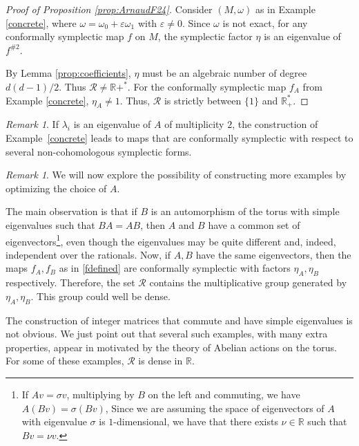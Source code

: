 \documentclass[11pt]{amsart}
\theoremstyle{definition}
\theoremstyle{remark}
\newtheorem{rem}[thm]{Remark}
\numberwithin{equation}{section}
\newcommand{\R}{\mathbb R}
\newcommand{\eps}{\varepsilon}
\def\cR{\mathcal{R}}
\begin{document}
\begin{proof}[Proof of Proposition \ref{prop:ArnaudF24}]
 Consider $(M,\omega)$ as in Example \ref{concrete}, where $\omega = \omega_0 + \eps \omega_1$ with $\eps\neq0$.
 Since $\omega$ is not exact, for any conformally symplectic map $f$ on $M$, the symplectic factor $\eta$ is an eigenvalue of $f^{\# 2}$.


 By Lemma \ref{prop:coefficients}, $\eta$ must be an algebraic number of degree $d(d-1)/2$.
 Thus $\mathcal{R}\neq \R+^*$.
 For the conformally symplectic map $f_A$ from Example \ref{concrete}, $\eta_A\neq 1$.
 Thus,  $\mathcal{R}$ is strictly between $\{1\}$ and $\R_+^*$.
\end{proof}




\begin{rem}
  If $\lambda_i$ is an eigenvalue of $A$ of multiplicity $2$,
  the construction of Example~\ref{concrete} leads to
  maps that are conformally symplectic with respect to
  several non-cohomologous symplectic forms.
\end{rem}

\begin{rem}
We will now explore the possibility of
constructing more examples by optimizing the choice of $A$.

The main  observation is that if $B$ is an automorphism of
the torus with simple eigenvalues such that $BA = AB$, then
$A$ and $B$ have a common set of eigenvectors\footnote{
If $Av = \sigma v$, multiplying by $B$ on the left and
commuting, we have $A (Bv)= \sigma(B v)$,
Since we are assuming the space of eigenvectors of $A$ with eigenvalue $\sigma$
is $1$-dimensional, we have that there exists $\nu \in \R$ such that $Bv = \nu v$.}, even though the eigenvalues
may be quite different and, indeed, independent over the rationals.
Now, if $A, B$ have the same eigenvectors, then the maps
$f_A, f_B$ as in \eqref{fdefined}  are conformally
symplectic with factors $\eta_A, \eta_B$ respectively.
Therefore, the set $\cR$ contains the multiplicative group generated
by $\eta_A, \eta_B$. This group could well be dense.



The construction of integer matrices that commute and have simple eigenvalues
is not obvious.
We just point out
that several such  examples, with many
extra properties, appear in \cite[p. 61 ff.]{KatoKN11}
motivated by the theory of Abelian actions on the torus.
For some of these examples,  $\mathcal{R}$ is dense in $\R$.
\end{rem}
\end{document}
